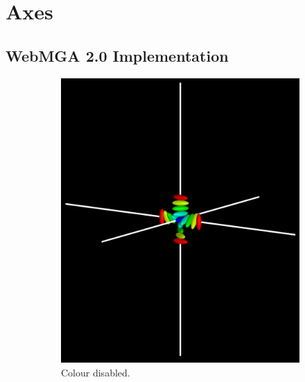 \section{Axes}

\subsection{WebMGA 2.0 Implementation}
\begin{figure}
  \begin{center}
    \begin{subfigure}{0.4\textwidth}
      \includegraphics[width=\linewidth]{assets/images/axes/2_no_colour}
      \caption{Colour disabled.}
      \label{fig:original_axes_no_colour}
    \end{subfigure}
    \begin{subfigure}{0.4\textwidth}

\end{subfigure}
\end{center}
\end{figure}
